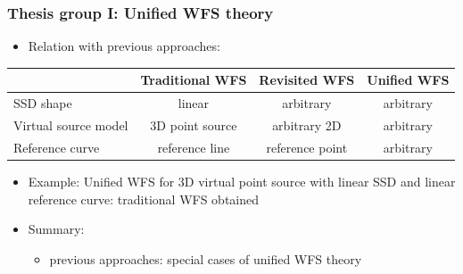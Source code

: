 \documentclass{beamer}
\renewcommand{\arraystretch}{1}
\begin{document}
\begin{frame}
\frametitle{Thesis group I: Unified WFS theory}

\begin{itemize}
\item Relation with previous approaches:
\end{itemize}
%
\begin{table}
\small
\renewcommand*{\arraystretch}{1.5}
\hspace{-5mm}
\begin{tabular}{l | c | c | c  }
 		 			 & Traditional WFS  & Revisited WFS    & Unified WFS\\
\hline \hline
SSD shape 			 &  linear 		    &   arbitrary      & arbitrary  \\ 
Virtual source model &  3D point source &  arbitrary 2D    & arbitrary  \\
Reference curve 	 &  reference line  &  reference point & arbitrary
\end{tabular}
\end{table}
%
	\vspace{2mm}
	
\begin{itemize}
\item Example: Unified WFS for 3D virtual point source with linear SSD and linear reference curve: traditional WFS obtained
\end{itemize}
\begin{tcolorbox}
\begin{itemize}
\item Summary:
	\begin{itemize}
	\item previous approaches: special cases of unified WFS theory
	\end{itemize}	
\end{itemize}
\end{tcolorbox}	
\end{frame}
\end{document}
